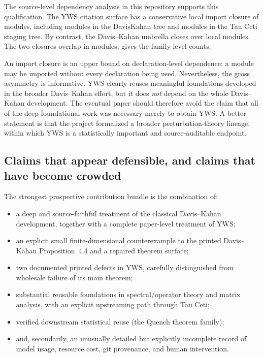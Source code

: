 \documentclass[11pt]{article}
\newcommand{\TauCeti}{Tau Ceti}
\begin{document}
The source-level dependency analysis in this repository supports this
qualification.  The YWS citation surface has a conservative local import
closure of \YWSImportClosure{} modules, including \YWSDKImports{} modules in the
DavisKahan tree and \YWSTauCetiImports{} modules in the \TauCeti{} staging tree.
By contrast, the Davis--Kahan umbrella closes over \DKUmbrellaImportClosure{}
local modules.  The two closures overlap in \YWSDKOverlap{} modules.
 gives the family-level counts.



An import closure is an upper bound on declaration-level dependence: a module
may be imported without every declaration being used.  Nevertheless, the gross
asymmetry is informative.  YWS clearly reuses meaningful foundations developed
in the broader Davis--Kahan effort, but it does \emph{not} depend on the whole
Davis--Kahan development.  The eventual paper should therefore avoid the claim
that all of the deep foundational work was necessary merely to obtain YWS.  A
better statement is that the project formalized a broader perturbation-theory
lineage, within which YWS is a statistically important and source-auditable
endpoint.

\subsection{Claims that appear defensible, and claims that have become crowded}

The strongest prospective contribution bundle is the combination of:

\begin{itemize}
  \item a deep and source-faithful treatment of the classical Davis--Kahan
        development, together with a complete paper-level treatment of YWS;
  \item an explicit small finite-dimensional counterexample to the printed
        Davis--Kahan Proposition~4.4 and a repaired theorem surface;
  \item two documented printed defects in YWS, carefully distinguished from
        wholesale failure of its main theorem;
  \item substantial reusable foundations in spectral/operator theory and matrix
        analysis, with an explicit upstreaming path through \TauCeti{};
  \item verified downstream statistical reuse (the Quench theorem family);
  \item and, secondarily, an unusually detailed but explicitly incomplete record
        of model usage, resource cost, git provenance, and human intervention.
\end{itemize}
\end{document}
